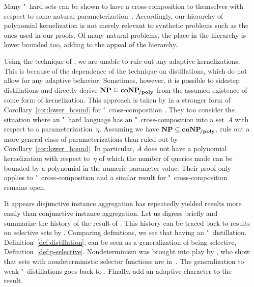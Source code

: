 Many "~hard sets can be shown to have a cross-composition to themselves with respect to some natural parameterization~\parencite{bodlaender2014kernelization,fomin2019kernelization}.
Accordingly, our hierarchy of polynomial kernelization is not merely relevant to synthetic problems such as the ones used in our proofs.
Of many natural problems, the place in the hierarchy is lower bounded too, adding to the appeal of the hierarchy.

Using the technique of \citeauthor{bodlaender2009problems}, we are unable to rule out any adaptive kernelizations.
This is because of the dependence of the technique on distillations, which do not allow for any adaptive behavior.
Sometimes, however, it is possible to sidestep distillations and directly derive $\textnormal{\textbf{NP}} \subseteq \textnormal{\textbf{coNP}}\!_\textnormal{\textbf{/poly}}$ from the assumed existence of some form of kernelization.
This approach is taken by \citeauthor{dell2014satisfiability} in a stronger form of Corollary~\ref{cor:lower_bound} for "~cross-composition \parencite[Lemma~1]{dell2014satisfiability}.
They too consider the situation where an "~hard language has an "~cross-composition into a set~$A$ with respect to a parameterization~$\eta$.
Assuming we have $\textnormal{\textbf{NP}} \subseteq \textnormal{\textbf{coNP}}\!_\textnormal{\textbf{/poly}}$, \citeauthor{dell2014satisfiability} rule out a more general class of parameterizations than ruled out by Corollary~\ref{cor:lower_bound}.
In particular, $A$ does not have a polynomial kernelization with respect to~$\eta$ of which the number of queries made can be bounded by a polynomial in the numeric parameter value.
Their proof only applies to "~cross-composition and a similar result for "~cross-composition remains open.

It appears disjunctive instance aggregation has repeatedly yielded results more easily than conjunctive instance aggregation.
Let us digress briefly and summarize the history of the result of \citeauthor{dell2014satisfiability}.
This history can be traced back to results on \pdash{}selective sets by \textcite{ko1983self}.
Comparing definitions, we see that having an "~distillation, Definition~\ref{def:distillation}, can be seen as a generalization of being \pdash{}selective, Definition~\ref{def:p-selective}.
Nondeterminism was brought into play by \textcite{hemaspaandra1995nondeterministically}, who show that sets with nondeterministic selector functions are in~.
The generalization to weak "~distillations goes back to \textcite{fortnow2011infeasibility}.
Finally, \textcite{dell2014satisfiability} add an adaptive character to the result.
